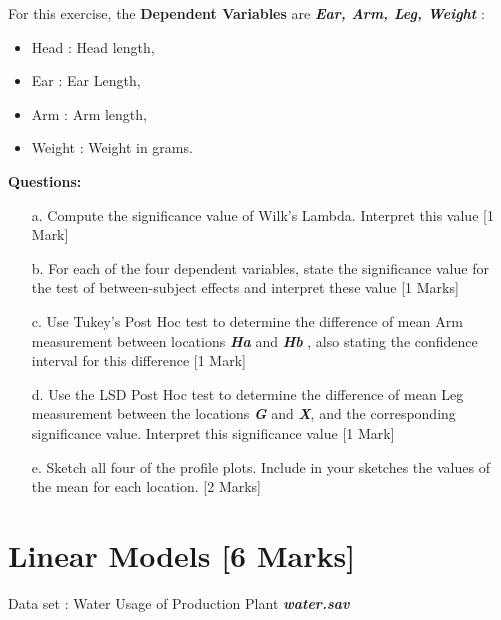 \documentclass[12pt, a4paper]{article}
\theoremstyle{plain}
\theoremstyle{definition}
\theoremstyle{remark}
\begin{document}
\noindent For this exercise, the \textbf{Dependent Variables} are \textbf{\textit{Ear, Arm, Leg, Weight }}:
\begin{itemize}
\item 	Head : Head length,
\item 	Ear : Ear Length,
\item 	Arm	: Arm length,
\item   Weight : Weight in grams.
\end{itemize}
\bigskip
\noindent \textbf{Questions:}
\begin{itemize}
\item[a.] Compute the significance value of Wilk's Lambda. Interpret this value [1 Mark]
\item[b.] For each of the four dependent variables, state the significance value for the test of between-subject effects and interpret these value [1 Marks]
\item[c.] Use Tukey's Post Hoc test to determine the difference of mean Arm measurement between locations \textbf{\textit{Ha}} and \textbf{\textit{Hb}} , also stating the confidence interval for this difference [1 Mark]
\item[d.] Use the LSD Post Hoc test to determine the difference of mean Leg measurement between the locations \textbf{\textit{G}} and \textbf{\textit{X}}, and the corresponding significance value. Interpret this significance value [1 Mark] %
\item[e.] Sketch all four of the profile plots. Include in your sketches the values of the mean for each location. [2 Marks] %
\end{itemize}
\newpage
\newpage
\section{Linear Models [6 Marks] }  %

Data set : Water Usage of Production Plant \textit{\textbf{water.sav}}\\
\end{document}
